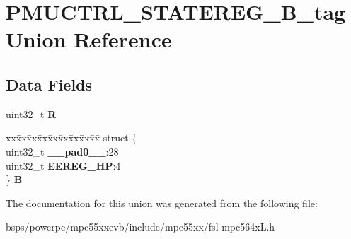 \hypertarget{unionPMUCTRL__STATEREG__32B__tag}{}\section{P\+M\+U\+C\+T\+R\+L\+\_\+\+S\+T\+A\+T\+E\+R\+E\+G\+\_\+B\+\_\+tag Union Reference}
\label{unionPMUCTRL__STATEREG__32B__tag}
\subsection*{Data Fields}
\begin{DoxyCompactItemize}
\item 
\mbox{\label{unionPMUCTRL__STATEREG__32B__tag_a8f70c6b9c13a2a9144e986839e85dcf9}} 
uint32\+\_\+t {\bfseries R}
\item 
\mbox{\label{unionPMUCTRL__STATEREG__32B__tag_a02eadbc32c49e127c8448e185e32257b}} 
\begin{tabbing}
xx\=xx\=xx\=xx\=xx\=xx\=xx\=xx\=xx\=\kill
struct \{\\
\>uint32\_t {\bfseries \_\_pad0\_\_}:28\\
\>uint32\_t {\bfseries EEREG\_HP}:4\\
\} {\bfseries B}\\

\end{tabbing}\end{DoxyCompactItemize}


The documentation for this union was generated from the following file\+:\begin{DoxyCompactItemize}
\item 
bsps/powerpc/mpc55xxevb/include/mpc55xx/fsl-\/mpc564x\+L.\+h\end{DoxyCompactItemize}
